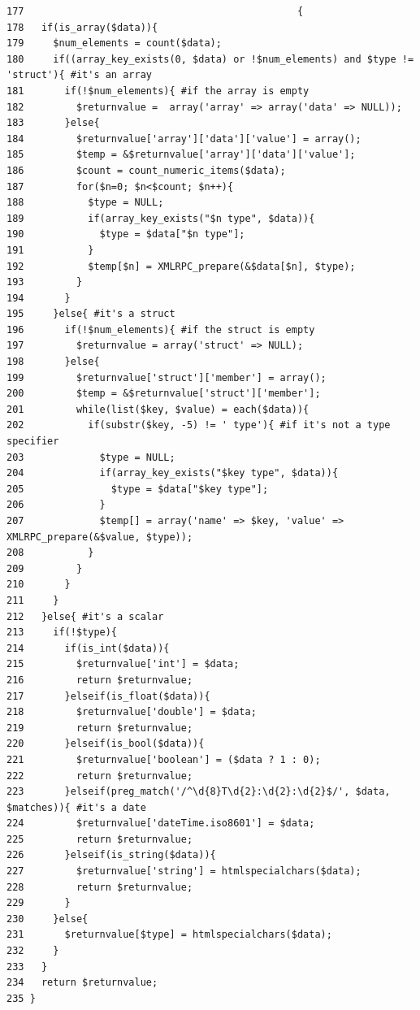 \begin{Code}\begin{verbatim}177                                               {
178   if(is_array($data)){
179     $num_elements = count($data);
180     if((array_key_exists(0, $data) or !$num_elements) and $type != 'struct'){ #it's an array
181       if(!$num_elements){ #if the array is empty
182         $returnvalue =  array('array' => array('data' => NULL));
183       }else{
184         $returnvalue['array']['data']['value'] = array();
185         $temp = &$returnvalue['array']['data']['value'];
186         $count = count_numeric_items($data);
187         for($n=0; $n<$count; $n++){
188           $type = NULL;
189           if(array_key_exists("$n type", $data)){
190             $type = $data["$n type"];
191           }
192           $temp[$n] = XMLRPC_prepare(&$data[$n], $type);
193         }
194       }
195     }else{ #it's a struct
196       if(!$num_elements){ #if the struct is empty
197         $returnvalue = array('struct' => NULL);
198       }else{
199         $returnvalue['struct']['member'] = array();
200         $temp = &$returnvalue['struct']['member'];
201         while(list($key, $value) = each($data)){
202           if(substr($key, -5) != ' type'){ #if it's not a type specifier
203             $type = NULL;
204             if(array_key_exists("$key type", $data)){
205               $type = $data["$key type"];
206             }
207             $temp[] = array('name' => $key, 'value' => XMLRPC_prepare(&$value, $type));
208           }
209         }
210       }
211     }
212   }else{ #it's a scalar
213     if(!$type){
214       if(is_int($data)){
215         $returnvalue['int'] = $data;
216         return $returnvalue;
217       }elseif(is_float($data)){
218         $returnvalue['double'] = $data;
219         return $returnvalue;
220       }elseif(is_bool($data)){
221         $returnvalue['boolean'] = ($data ? 1 : 0);
222         return $returnvalue;
223       }elseif(preg_match('/^\d{8}T\d{2}:\d{2}:\d{2}$/', $data, $matches)){ #it's a date
224         $returnvalue['dateTime.iso8601'] = $data;
225         return $returnvalue;
226       }elseif(is_string($data)){
227         $returnvalue['string'] = htmlspecialchars($data);
228         return $returnvalue;
229       }
230     }else{
231       $returnvalue[$type] = htmlspecialchars($data);
232     }
233   }
234   return $returnvalue;
235 }
\end{verbatim}
\end{Code}




